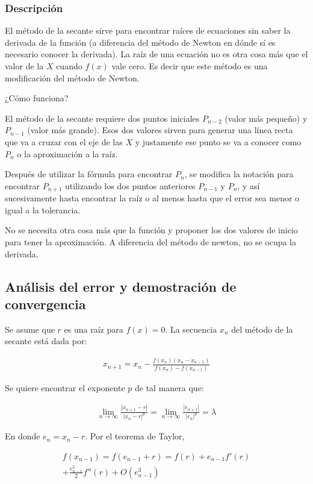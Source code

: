 \subsubsection{Descripción}
El método de la secante sirve para encontrar raíces de ecuaciones sin saber la derivada de la función (a diferencia del método de Newton en dónde sí es necesario conocer la derivada). La raíz de una ecuación no es otra cosa más que el valor de la $X$ cuando $f(x)$ vale cero. Es decir que este método es una modificación del método de Newton.

¿Cómo funciona?

El método de la secante requiere dos puntos iniciales $P_{n-2}$ (valor más pequeño) y $P_{n-1}$ (valor más grande). Esos dos valores sirven para generar una línea recta que va a cruzar con el eje de las $X$ y justamente ese punto se va a conocer como $P_n$ o la aproximación a la raíz.

Después de utilizar la fórmula para encontrar $P_n$, se modifica la notación para encontrar $P_{n+1}$ utilizando los dos puntos anteriores $P_{n-1}$ y $P_n$, y así sucesivamente hasta encontrar la raíz o al menos hasta que el error sea menor o igual a la tolerancia. 

No se necesita otra cosa más que la función y proponer los dos valores de inicio para tener la aproximación. A diferencia del método de newton, no se ocupa la derivada.


\subsection{Análisis del error y demostración de convergencia}

Se asume que $r$ es una raíz para $f(x)=0$. La secuencia ${x_n}$ del método de la secante está dada por: 

\begin{gather*}
x_{n+1 }= x_{n} - \frac{f(x_{n})(x_{n}-x_{n-1})}{f(x_{n})-f(x_{n-1})} 
\end{gather*}

Se quiere encontrar el exponente $p$ de tal manera que:

\begin{gather*}
\lim_{n\to \infty} \frac{|x_{n+1}-r|}{|x_n - r|^{p}} = \lim_{n\to \infty} \frac{|e_{n+1}|}{|e_n|^{p}} = \lambda
\end{gather*}

En donde $e_n = x_n - r$. Por el teorema de Taylor,

\begin{gather*}
f(x_{n-1})= f(e_{n-1}+r) = f(r)+e_{n-1}f'(r) \\
+\frac{e^{2}_{n-1}}{2}f''(r)+O(e^{3}_{n-1})
\end{gather*}

